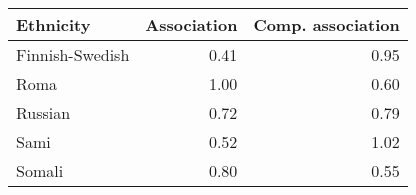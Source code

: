 \begin{tabular}{lrr}
\toprule
      Ethnicity &  Association &  Comp. association \\
\midrule
Finnish-Swedish &         0.41 &               0.95 \\
           Roma &         1.00 &               0.60 \\
        Russian &         0.72 &               0.79 \\
           Sami &         0.52 &               1.02 \\
         Somali &         0.80 &               0.55 \\
\bottomrule
\end{tabular}
